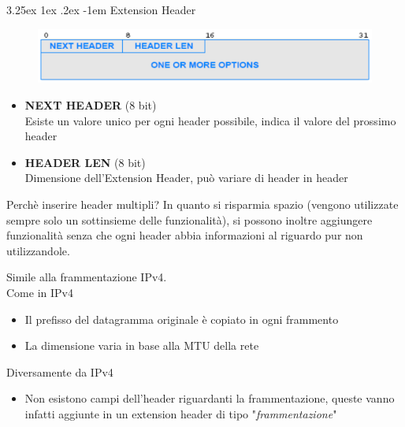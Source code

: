 \documentclass{article}
\makeatletter
\newcounter{subsubsubsection}[subsubsection]
\renewcommand\paragraph{\@startsection{paragraph}{5}{\z@}%
  {3.25ex \@plus1ex \@minus.2ex}%
  {-1em}%
  {\normalfont\normalsize\bfseries}}
\makeatother
\begin{document}
                    \paragraph{Extension Header} 
                        \begin{figure}[H]
                            \centering
                            \includegraphics[width=\textwidth]{pic/extension_header_ipv6.png}
                            \label{Extension Header IPv6}
                        \end{figure}
                        \begin{itemize}
                            \item \textbf{NEXT HEADER} (8 bit)\\
                                  Esiste un valore unico per ogni header possibile, indica il valore del prossimo header
                            \item \textbf{HEADER LEN} (8 bit)\\
                                  Dimensione dell'Extension Header, può variare di header in header
                        \end{itemize}
                    Perchè inserire header multipli? In quanto si risparmia spazio (vengono utilizzate sempre solo un sottinsieme delle funzionalità), si possono inoltre aggiungere funzionalità senza che ogni header abbia informazioni al riguardo pur non utilizzandole.

                    Simile alla frammentazione IPv4.\\
                    Come in IPv4
                    \begin{itemize}
                        \item Il prefisso del datagramma originale è copiato in ogni frammento
                        \item La dimensione varia in base alla MTU della rete
                    \end{itemize}
                    Diversamente da IPv4
                    \begin{itemize}
                        \item Non esistono campi dell'header riguardanti la frammentazione, queste vanno infatti aggiunte in un extension header di tipo "\textit{frammentazione}"
                    \end{itemize}
\end{document}
